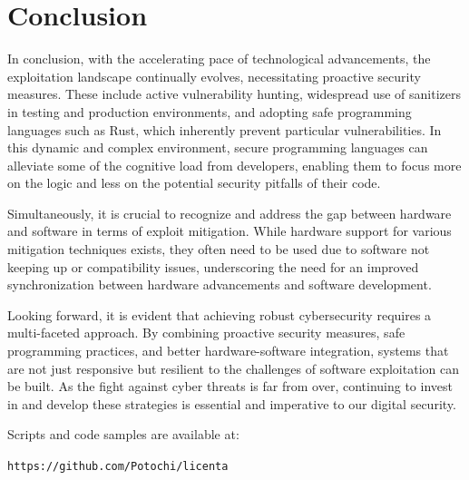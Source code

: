 \documentclass{article}
\begin{document}
\section{Conclusion}
In conclusion, with the accelerating pace of technological advancements, the exploitation landscape continually evolves, necessitating proactive security measures. These include active vulnerability hunting, widespread use of sanitizers in testing and production environments, and adopting safe programming languages such as Rust, which inherently prevent particular vulnerabilities. In this dynamic and complex environment, secure programming languages can alleviate some of the cognitive load from developers, enabling them to focus more on the logic and less on the potential security pitfalls of their code.

Simultaneously, it is crucial to recognize and address the gap between hardware and software in terms of exploit mitigation. While hardware support for various mitigation techniques exists, they often need to be used due to software not keeping up or compatibility issues, underscoring the need for an improved synchronization between hardware advancements and software development.

Looking forward, it is evident that achieving robust cybersecurity requires a multi-faceted approach. By combining proactive security measures, safe programming practices, and better hardware-software integration, systems that are not just responsive but resilient to the challenges of software exploitation can be built. As the fight against cyber threats is far from over, continuing to invest in and develop these strategies is essential and imperative to our digital security.

Scripts and code samples are available at:

\texttt{https://github.com/Potochi/licenta}

\printbibliography
\end{document}
